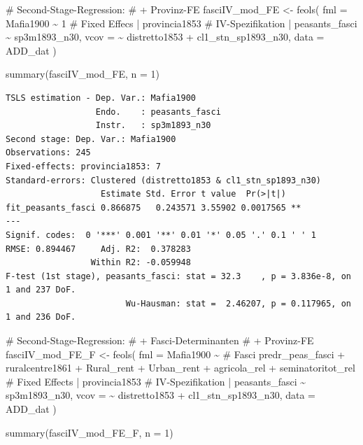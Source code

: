 \documentclass[
  a4paper,
  DIV=11,
  oneside]{scrreprt}
\newenvironment{Shaded}{\begin{snugshade}}{\end{snugshade}}
\newcommand{\AttributeTok}[1]{\textcolor[rgb]{0.40,0.45,0.13}{#1}}
\newcommand{\CommentTok}[1]{\textcolor[rgb]{0.37,0.37,0.37}{#1}}
\newcommand{\DecValTok}[1]{\textcolor[rgb]{0.68,0.00,0.00}{#1}}
\newcommand{\FunctionTok}[1]{\textcolor[rgb]{0.28,0.35,0.67}{#1}}
\newcommand{\NormalTok}[1]{\textcolor[rgb]{0.00,0.23,0.31}{#1}}
\newcommand{\OtherTok}[1]{\textcolor[rgb]{0.00,0.23,0.31}{#1}}
\newcommand{\SpecialCharTok}[1]{\textcolor[rgb]{0.37,0.37,0.37}{#1}}
\begin{document}
\begin{Shaded}
\begin{Highlighting}[]
\CommentTok{\# Second{-}Stage{-}Regression:}
\CommentTok{\# + Provinz{-}FE}
\NormalTok{fasciIV\_mod\_FE }\OtherTok{\textless{}{-}} \FunctionTok{feols}\NormalTok{(}
  \AttributeTok{fml =}\NormalTok{ Mafia1900 }\SpecialCharTok{\textasciitilde{}} \DecValTok{1} 
  \CommentTok{\# Fixed Effecs}
  \SpecialCharTok{|}\NormalTok{ provincia1853 }
  \CommentTok{\# IV{-}Spezifikation}
  \SpecialCharTok{|}\NormalTok{ peasants\_fasci }\SpecialCharTok{\textasciitilde{}}\NormalTok{ sp3m1893\_n30,}
  \AttributeTok{vcov =} \SpecialCharTok{\textasciitilde{}}\NormalTok{ distretto1853 }\SpecialCharTok{+}\NormalTok{ cl1\_stn\_sp1893\_n30,}
  \AttributeTok{data =}\NormalTok{ ADD\_dat}
\NormalTok{) }

\FunctionTok{summary}\NormalTok{(fasciIV\_mod\_FE, }\AttributeTok{n =} \DecValTok{1}\NormalTok{)}
\end{Highlighting}
\end{Shaded}

\begin{verbatim}
TSLS estimation - Dep. Var.: Mafia1900
                  Endo.    : peasants_fasci
                  Instr.   : sp3m1893_n30
Second stage: Dep. Var.: Mafia1900
Observations: 245
Fixed-effects: provincia1853: 7
Standard-errors: Clustered (distretto1853 & cl1_stn_sp1893_n30) 
                   Estimate Std. Error t value  Pr(>|t|)    
fit_peasants_fasci 0.866875   0.243571 3.55902 0.0017565 ** 
---
Signif. codes:  0 '***' 0.001 '**' 0.01 '*' 0.05 '.' 0.1 ' ' 1
RMSE: 0.894467     Adj. R2:  0.378283
                 Within R2: -0.059948
F-test (1st stage), peasants_fasci: stat = 32.3    , p = 3.836e-8, on 1 and 237 DoF.
                        Wu-Hausman: stat =  2.46207, p = 0.117965, on 1 and 236 DoF.
\end{verbatim}

\begin{Shaded}
\begin{Highlighting}[]
\CommentTok{\# Second{-}Stage{-}Regression:}
\CommentTok{\# + Fasci{-}Determinanten}
\CommentTok{\# + Provinz{-}FE}
\NormalTok{fasciIV\_mod\_FE\_F }\OtherTok{\textless{}{-}} \FunctionTok{feols}\NormalTok{(}
  \AttributeTok{fml =}\NormalTok{ Mafia1900 }\SpecialCharTok{\textasciitilde{}} 
    \CommentTok{\# Fasci}
\NormalTok{    predr\_peas\_fasci}
  \SpecialCharTok{+}\NormalTok{ ruralcentre1861}
  \SpecialCharTok{+}\NormalTok{ Rural\_rent}
  \SpecialCharTok{+}\NormalTok{ Urban\_rent}
  \SpecialCharTok{+}\NormalTok{ agricola\_rel}
  \SpecialCharTok{+}\NormalTok{ seminatoritot\_rel}
    \CommentTok{\# Fixed Effects}
  \SpecialCharTok{|}\NormalTok{ provincia1853}
    \CommentTok{\# IV{-}Spezifikation}
  \SpecialCharTok{|}\NormalTok{ peasants\_fasci }\SpecialCharTok{\textasciitilde{}}\NormalTok{ sp3m1893\_n30,}
  \AttributeTok{vcov =} \SpecialCharTok{\textasciitilde{}}\NormalTok{ distretto1853 }\SpecialCharTok{+}\NormalTok{ cl1\_stn\_sp1893\_n30,}
  \AttributeTok{data =}\NormalTok{ ADD\_dat}
\NormalTok{) }

\FunctionTok{summary}\NormalTok{(fasciIV\_mod\_FE\_F, }\AttributeTok{n =} \DecValTok{1}\NormalTok{)}
\end{Highlighting}
\end{Shaded}
\end{document}
